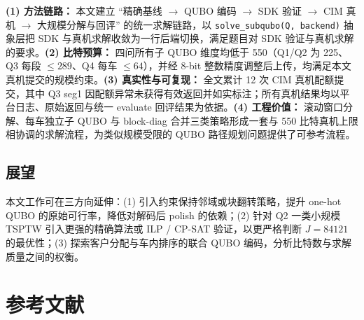 \documentclass[UTF8,12pt,a4paper]{ctexart}
\begin{document}
\textbf{(1) 方法链路：} 本文建立 ``精确基线 $\to$ QUBO 编码 $\to$ SDK 验证 $\to$ CIM 真机 $\to$ 大规模分解与回评'' 的统一求解链路，以 \texttt{solve\_subqubo(Q, backend)} 抽象层把 SDK 与真机求解收敛为一行后端切换，满足题目对 SDK 验证与真机求解的要求。\textbf{(2) 比特预算：} 四问所有子 QUBO 维度均低于 550（Q1/Q2 为 225、Q3 每段 $\le 289$、Q4 每车 $\le 64$），并经 8-bit 整数精度调整后上传，均满足本文真机提交的规模约束。\textbf{(3) 真实性与可复现：} 全文累计 12 次 CIM 真机配额提交，其中 Q3 seg1 因配额异常未获得有效返回并如实标注；所有真机结果均以平台日志、原始返回与统一 evaluate 回评结果为依据。\textbf{(4) 工程价值：} 滚动窗口分解、每车独立子 QUBO 与 block-diag 合并三类策略形成一套与 550 比特真机上限相协调的求解流程，为类似规模受限的 QUBO 路径规划问题提供了可参考流程。

\subsection{展望}

本文工作可在三方向延伸：(1) 引入约束保持邻域或块翻转策略，提升 one-hot QUBO 的原始可行率，降低对解码后 polish 的依赖；(2) 针对 Q2 一类小规模 TSPTW 引入更强的精确算法或 ILP / CP-SAT 验证，以更严格判断 $J\!=\!84121$ 的最优性；(3) 探索客户分配与车内排序的联合 QUBO 编码，分析比特数与求解质量之间的权衡。

\section*{参考文献}
\end{document}
